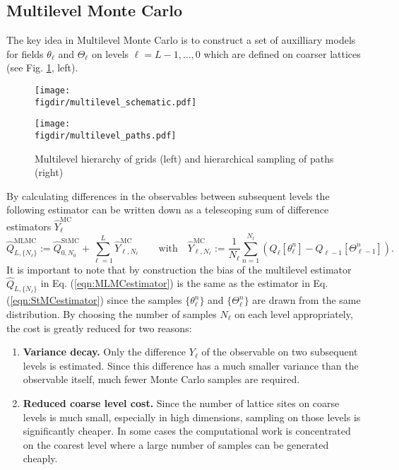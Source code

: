 \documentclass[11pt]{article}
\newcommand{\figdir}{./figures/}
\begin{document}
\subsection{Multilevel Monte Carlo}
The key idea in Multilevel Monte Carlo is to construct a set of auxilliary models for fields $\theta_\ell$ and $\Theta_\ell$ on levels $\ell=L-1,\dots,0$ which are defined on coarser lattices (see Fig. \ref{fig:multilevel}, left).
\begin{figure}
  \begin{center}
  \begin{minipage}{0.55\linewidth}
    \texttt{[image: \\figdir/multilevel\_schematic.pdf]}
  \end{minipage}
  \hfill
  \begin{minipage}{0.4\linewidth}
    \texttt{[image: \\figdir/multilevel\_paths.pdf]}
  \end{minipage}
  \caption{Multilevel hierarchy of grids (left) and hierarchical sampling of paths (right)}\label{fig:multilevel}
  \end{center}
\end{figure}
By calculating differences in the observables between subsequent levels the following estimator can be written down as a telescoping sum of difference estimators $\hat{Y}^{\text{MC}}_\ell$
\begin{equation}
  \hat{Q}_{L,\{N_\ell\}}^{\text{MLMC}} := \hat{Q}_{0,N_0}^{\text{StMC}} + \sum_{\ell=1}^L \hat{Y}_{\ell,N_\ell}^{\text{MC}}\qquad\text{with}\quad
  \hat{Y}_{\ell,N_\ell}^{\text{MC}} :=  \frac{1}{N_\ell}\sum_{n=1}^{N_\ell} \left(Q_\ell[\theta_\ell^n] - Q_{\ell-1}[\Theta_{\ell-1}^n]\right).\label{eqn:MLMCestimator}
\end{equation}
It is important to note that by construction the bias of the multilevel estimator $\hat{Q}_{L,\{N_\ell\}}$ in Eq. (\ref{eqn:MLMCestimator}) is the same as the estimator in Eq. (\ref{eqn:StMCestimator}) since the samples $\{\theta_\ell^n\}$ and $\{\Theta_\ell^n\}$ are drawn from the same distribution. By choosing the number of samples $N_\ell$ on each level appropriately, the cost is greatly reduced for two reasons:
\begin{enumerate}
\item \textbf{Variance decay.} Only the difference $Y_\ell$ of the observable on two subsequent levels is estimated. Since this difference has a much smaller variance than the observable itself, much fewer Monte Carlo samples are required. 
  \item \textbf{Reduced coarse level cost.} Since the number of lattice sites on coarse levels is much small, especially in high dimensions, sampling on those levels is significantly cheaper. In some cases the computational work is concentrated on the coarest level where a large number of samples can be generated cheaply.
\end{enumerate}
\end{document}
